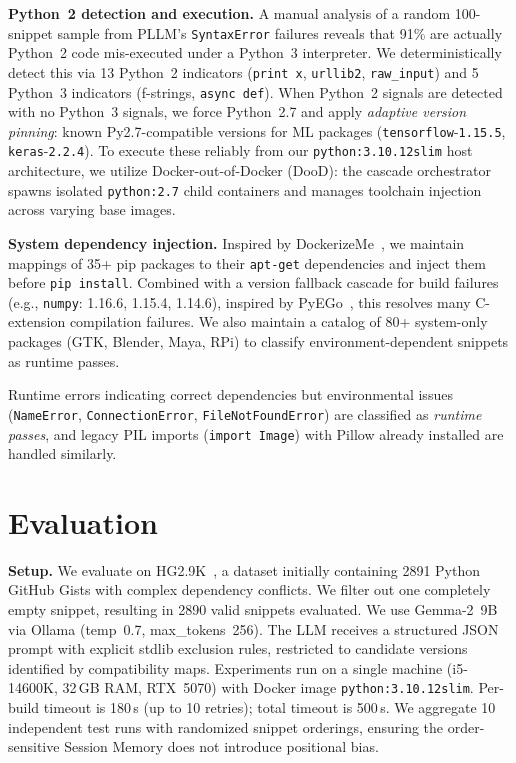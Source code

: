 \documentclass[sigconf,screen]{acmart}
\begin{document}
\textbf{Python~2 detection and execution.}
A manual analysis of a random 100-snippet sample from PLLM's \texttt{SyntaxError} failures reveals that 91\% are actually Python~2 code mis-executed under a Python~3 interpreter.
We deterministically detect this via 13 Python~2 indicators (\texttt{print x}, \texttt{urllib2}, \texttt{raw\_input}) and 5 Python~3 indicators (f-strings, \texttt{async def}).
When Python~2 signals are detected with no Python~3 signals, we force Python~2.7 and apply \emph{adaptive version pinning}: known Py2.7-compatible versions for ML packages (\texttt{tensorflow}-\texttt{1.15.5}, \texttt{keras}-\texttt{2.2.4}).
To execute these reliably from our \texttt{python:3.10.12\discretionary{-}{}{-}slim} host architecture, we utilize Docker-out-of-Docker (DooD): the cascade orchestrator spawns isolated \texttt{python:2.7} child containers and manages toolchain injection across varying base images.

\textbf{System dependency injection.}
Inspired by DockerizeMe~\cite{horton2019}, we maintain mappings of 35+ pip packages to their \texttt{apt-get} dependencies and inject them before \texttt{pip install}.
Combined with a version fallback cascade for build failures (e.g., \texttt{numpy}: 1.16.6, 1.15.4, 1.14.6), inspired by PyEGo~\cite{ye2022pyego}, this resolves many C-extension compilation failures.
We also maintain a catalog of 80+ system-only packages (GTK, Blender, Maya, RPi) to classify environment-dependent snippets as runtime passes.

Runtime errors indicating correct dependencies but environmental issues (\texttt{NameError}, \texttt{ConnectionError}, \texttt{FileNotFoundError}) are classified as \emph{runtime passes}, and legacy PIL imports (\texttt{import Image}) with Pillow already installed are handled similarly.

\section{Evaluation}
\label{sec:eval}

\textbf{Setup.}
We evaluate on HG2.9K~\cite{horton2019}, a dataset initially containing \num{2891} Python GitHub Gists with complex dependency conflicts. We filter out one completely empty snippet, resulting in \num{2890} valid snippets evaluated.
We use Gemma-2~9B~\cite{gemma2} via Ollama (temp~0.7, max\_tokens~256).
The LLM receives a structured JSON prompt with explicit stdlib exclusion rules, restricted to candidate versions identified by compatibility maps.
Experiments run on a single machine (i5-14600K, 32\,GB RAM, RTX~5070) with Docker image \texttt{python:3.10.12\discretionary{-}{}{-}slim}.
Per-build timeout is 180\,s (up to 10 retries); total timeout is 500\,s.
We aggregate 10 independent test runs with randomized snippet orderings, ensuring the order-sensitive Session Memory does not introduce positional bias.
\end{document}
